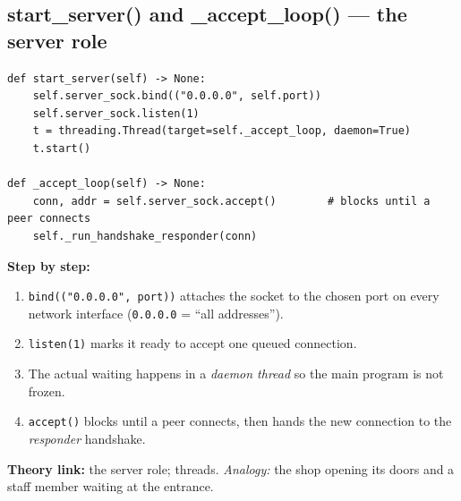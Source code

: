 \documentclass[11pt,a4paper]{report}
\begin{document}
\subsection{start\_server() and \_accept\_loop() --- the server role}
\begin{lstlisting}[style=py,caption={vehicle\_node.py --- listening for a peer.}]
def start_server(self) -> None:
    self.server_sock.bind(("0.0.0.0", self.port))
    self.server_sock.listen(1)
    t = threading.Thread(target=self._accept_loop, daemon=True)
    t.start()

def _accept_loop(self) -> None:
    conn, addr = self.server_sock.accept()        # blocks until a peer connects
    self._run_handshake_responder(conn)
\end{lstlisting}
\textbf{Step by step:}
\begin{enumerate}
  \item \texttt{bind(("0.0.0.0", port))} attaches the socket to the chosen port
        on every network interface (\texttt{0.0.0.0} = ``all addresses'').
  \item \texttt{listen(1)} marks it ready to accept one queued connection.
  \item The actual waiting happens in a \emph{daemon thread} so the main program
        is not frozen.
  \item \texttt{accept()} blocks until a peer connects, then hands the new
        connection to the \emph{responder} handshake.
\end{enumerate}
\textbf{Theory link:} the server role; threads. \emph{Analogy:} the shop opening
its doors and a staff member waiting at the entrance.
\end{document}
